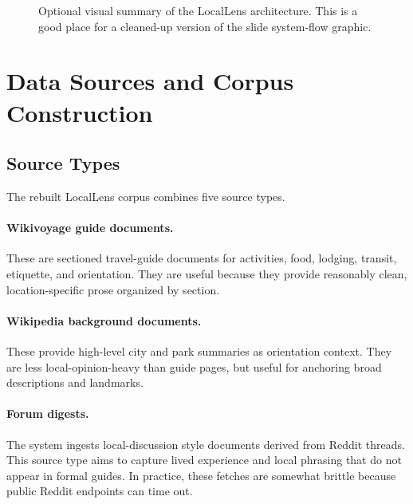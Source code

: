 \documentclass[11pt]{article}
\begin{document}
\begin{figure}[H]
\centering
{}
\caption{Optional visual summary of the LocalLens architecture. This is a good place for a cleaned-up version of the slide system-flow graphic.}
\label{fig:pipeline-visual}
\end{figure}

\section{Data Sources and Corpus Construction}
\subsection{Source Types}
The rebuilt LocalLens corpus combines five source types.

\paragraph{Wikivoyage guide documents.}
These are sectioned travel-guide documents for activities, food, lodging, transit, etiquette, and orientation. They are useful because they provide reasonably clean, location-specific prose organized by section.

\paragraph{Wikipedia background documents.}
These provide high-level city and park summaries as orientation context. They are less local-opinion-heavy than guide pages, but useful for anchoring broad descriptions and landmarks.

\paragraph{Forum digests.}
The system ingests local-discussion style documents derived from Reddit threads. This source type aims to capture lived experience and local phrasing that do not appear in formal guides. In practice, these fetches are somewhat brittle because public Reddit endpoints can time out.
\end{document}
